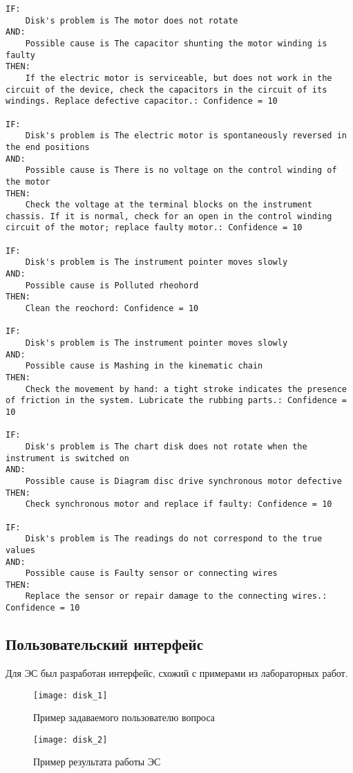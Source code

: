 \begin{lstlisting}[caption={Алгоритм работы ЭС}]
IF:
	Disk's problem is The motor does not rotate
AND:
	Possible cause is The capacitor shunting the motor winding is faulty
THEN:
	If the electric motor is serviceable, but does not work in the circuit of the device, check the capacitors in the circuit of its windings. Replace defective capacitor.: Confidence = 10

IF:
	Disk's problem is The electric motor is spontaneously reversed in the end positions
AND:
	Possible cause is There is no voltage on the control winding of the motor
THEN:
	Check the voltage at the terminal blocks on the instrument chassis. If it is normal, check for an open in the control winding circuit of the motor; replace faulty motor.: Confidence = 10

IF:
	Disk's problem is The instrument pointer moves slowly
AND:
	Possible cause is Polluted rheohord
THEN:
	Clean the reochord: Confidence = 10

IF:
	Disk's problem is The instrument pointer moves slowly
AND:
	Possible cause is Mashing in the kinematic chain
THEN:
	Check the movement by hand: a tight stroke indicates the presence of friction in the system. Lubricate the rubbing parts.: Confidence = 10

IF:
	Disk's problem is The chart disk does not rotate when the instrument is switched on
AND:
	Possible cause is Diagram disc drive synchronous motor defective
THEN:
	Check synchronous motor and replace if faulty: Confidence = 10

IF:
	Disk's problem is The readings do not correspond to the true values
AND:
	Possible cause is Faulty sensor or connecting wires
THEN:
	Replace the sensor or repair damage to the connecting wires.: Confidence = 10
\end{lstlisting}

\subsection{Пользовательский интерфейс}

Для ЭС был разработан интерфейс, схожий с примерами из лабораторных работ.

\begin{figure}[H]
	\centering
	\texttt{[image: disk\_1]}
	\caption{Пример задаваемого пользователю вопроса}
\end{figure}

\begin{figure}[H]
	\centering
	\texttt{[image: disk\_2]}
	\caption{Пример результата работы ЭС}
\end{figure}

